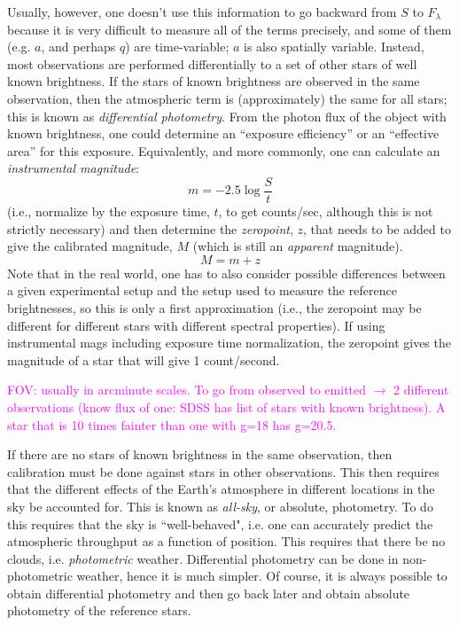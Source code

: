 \documentclass[12pt]{article}
\begin{document}
Usually, however, one doesn't use this information to go
backward from $S$ to $F_{\lambda}$ because it is very
difficult to measure all of the terms precisely, and some of them
(e.g. $a$, and perhaps $q$) are time-variable; $a$ is also spatially
variable. Instead, most observations are performed differentially to a
set of other stars of well known brightness. If the stars of known
brightness are observed in the same observation, then the atmospheric
term is (approximately) the same for all stars; this is known as
\emph{differential photometry}.
From the photon flux of the object with known
brightness, one could determine an ``exposure efficiency''
or an ``effective area'' for this
exposure. Equivalently, and more commonly, one can calculate an
\emph{instrumental magnitude}:
    $$  m = -2.5 \log \frac{S}{t} $$
(i.e., normalize by the exposure time, $t$, to get counts/sec, although this
is not strictly necessary) and then determine the \emph{zeropoint},
$z$, that needs
to be added to give the calibrated magnitude, $M$
(which is still an \emph{apparent} magnitude).
    $$ M = m + z $$
Note that in the real world, one has to also consider possible
differences between a given experimental setup and the setup used to
measure the reference brightnesses, so this is only a first
approximation (i.e., the zeropoint may be different for different
stars with different spectral properties). If using instrumental mags
including exposure time normalization, the zeropoint gives the
magnitude of a star that will give 1 count/second.

\textcolor{magenta}{FOV: usually in arcminute scales.
To go from observed to emitted $\rightarrow$ 2 different observations
(know flux of one: SDSS has list of stars with known brightness).
A star that is 10 times fainter than one with g=18 has g=20.5.
}

If there are no stars of known brightness in the same
observation, then calibration must be done against stars in other
observations. This then requires that the different effects of the
Earth's atmosphere in different locations in the sky be accounted for.
This is known as \emph{all-sky}, or absolute, photometry. To do this requires
that the sky is ``well-behaved", i.e. one can accurately predict the
atmospheric throughput as a function of position. This requires that
there be no clouds, i.e. \emph{photometric} weather. Differential photometry
can be done in non-photometric weather, hence it is much simpler. Of
course, it is always possible to obtain differential photometry and
then go back later and obtain absolute photometry of the reference
stars.
\end{document}
